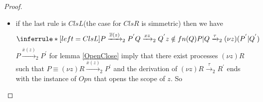 \begin{lemma}
\begin{proof}
\begin{description}
\begin{itemize}
	      \item
		if the last rule is $ClsL$(the case for $ClsR$ is simmetric) then we have
		\[
		    \inferrule* [left=ClsL]{
			P\xrightarrow{\overline{x}(z)}_{2}P^{'}
		      \\
			Q\xrightarrow{xz}_{2}Q^{'}
		      \\
			z\notin fn(Q)
		    }{
		      P|Q\xrightarrow{\tau}_{2}(\nu z)(P^{'}|Q^{'})
		    }
		\]
		$P\xrightarrow{\overline{x}(z)}_{2}P^{'}$ for lemma \ref{OpenClose} imply that there exist processes $(\nu z)R$ such that $P \equiv (\nu z)R \xrightarrow{\overline{x}(z)}_{2} P^{'}$ and the derivation of $(\nu z)R \xrightarrow{\tau}_{2} R^{'}$ ends with the instance of $Opn$ that opens the scope of $z$. So 

\end{itemize}
\end{description}
\end{proof}
\end{lemma}
